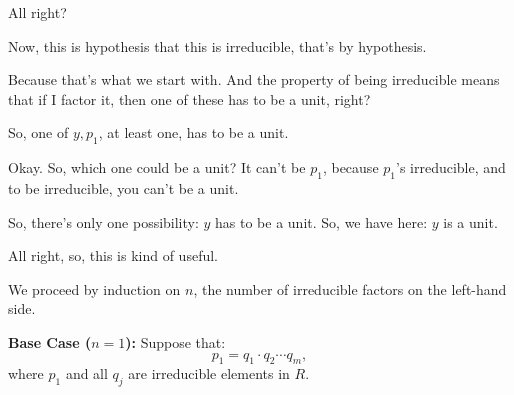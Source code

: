 \begin{proofWrapper}
\begin{speech}[00:37:55 - 00:39:17]
All right?

Now, this is hypothesis that this is irreducible, that's by hypothesis. 

Because that's what we start with. And the property of being irreducible means that if I factor it, then one of these has to be a unit, right?

So, one of $y, p_1$,  at least one,  has to be a unit. 

Okay. So, which one could be a unit? It can't be $p_1$, because $p_1$'s irreducible, and to be irreducible, you can't be a unit.

So, there's only one possibility: $y$ has to be a unit. So, we have here: $y$ is a unit. 

All right, so, this is kind of useful.
\end{speech}

\begin{content}[Base Case of the Induction ($n = 1$)]
We proceed by induction on $n$, the number of irreducible factors on the left-hand side.

\textbf{Base Case ($n = 1$):} Suppose that:
\begin{equation}\label{eq:base-case-setup}
p_1 = q_1 \cdot q_2 \cdots q_m,
\end{equation}
where $p_1$ and all $q_j$ are irreducible elements in $R$.


\end{content}
\end{proofWrapper}
